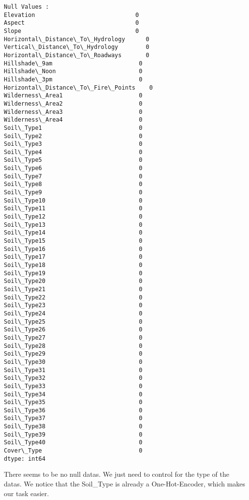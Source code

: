 \documentclass[11pt]{article}
\begin{document}
    \begin{Verbatim}[commandchars=\\\{\}]
Null Values : 
Elevation                             0
Aspect                                0
Slope                                 0
Horizontal\_Distance\_To\_Hydrology      0
Vertical\_Distance\_To\_Hydrology        0
Horizontal\_Distance\_To\_Roadways       0
Hillshade\_9am                         0
Hillshade\_Noon                        0
Hillshade\_3pm                         0
Horizontal\_Distance\_To\_Fire\_Points    0
Wilderness\_Area1                      0
Wilderness\_Area2                      0
Wilderness\_Area3                      0
Wilderness\_Area4                      0
Soil\_Type1                            0
Soil\_Type2                            0
Soil\_Type3                            0
Soil\_Type4                            0
Soil\_Type5                            0
Soil\_Type6                            0
Soil\_Type7                            0
Soil\_Type8                            0
Soil\_Type9                            0
Soil\_Type10                           0
Soil\_Type11                           0
Soil\_Type12                           0
Soil\_Type13                           0
Soil\_Type14                           0
Soil\_Type15                           0
Soil\_Type16                           0
Soil\_Type17                           0
Soil\_Type18                           0
Soil\_Type19                           0
Soil\_Type20                           0
Soil\_Type21                           0
Soil\_Type22                           0
Soil\_Type23                           0
Soil\_Type24                           0
Soil\_Type25                           0
Soil\_Type26                           0
Soil\_Type27                           0
Soil\_Type28                           0
Soil\_Type29                           0
Soil\_Type30                           0
Soil\_Type31                           0
Soil\_Type32                           0
Soil\_Type33                           0
Soil\_Type34                           0
Soil\_Type35                           0
Soil\_Type36                           0
Soil\_Type37                           0
Soil\_Type38                           0
Soil\_Type39                           0
Soil\_Type40                           0
Cover\_Type                            0
dtype: int64

    \end{Verbatim}

    There seems to be no null datas. We just need to control for the type of
the datas. We notice that the Soil\_Type is already a One-Hot-Encoder,
which makes our task easier.
\end{document}
